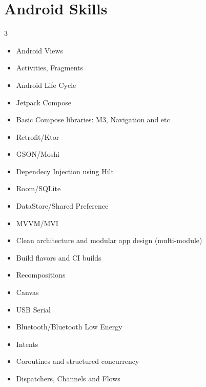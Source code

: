 \textcolor{darkgray}{\noindent\makebox[\linewidth]{\rule{\maxdimen}{2pt}}}


\section*{Android Skills}
\begin{multicols}{3}
    \begin{itemize}
        \item Android Views
        \item Activities, Fragments
        \item Android Life Cycle
        \item Jetpack Compose
        \item Basic Compose libraries: M3, Navigation and etc
        \item Retrofit/Ktor
        \item GSON/Moshi
        \item Dependecy Injection using Hilt
        \item Room/SQLite
        \item DataStore/Shared Preference
        \item MVVM/MVI
        \item Clean architecture and modular app design (multi-module)
        \item Build flavors and CI builds
        \item Recompositions
        \item Canvas
        \item USB Serial
        \item Bluetooth/Bluetooth Low Energy
        \item Intents
        \item Coroutines and structured concurrency
        \item Dispatchers, Channels and Flows
    \end{itemize}
\end{multicols}
\textcolor{darkgray}{\noindent\makebox[\linewidth]{\rule{\maxdimen}{2pt}}}